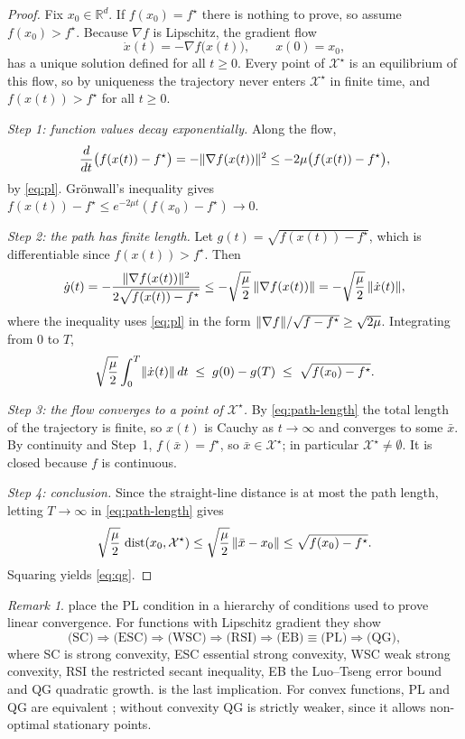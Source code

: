 \documentclass[11pt,a4paper,oneside]{report}
\theoremstyle{plain}
\theoremstyle{definition}
\theoremstyle{remark}
\newtheorem{remark}[theorem]{Remark}
\newcommand{\R}{\mathbb{R}}
\newcommand{\X}{\mathcal{X}^\star}
\DeclarePairedDelimiter{\norm}{\lVert}{\rVert}
\DeclareMathOperator{\dist}{dist}
\begin{document}
\begin{proof}
Fix $x_0\in\R^d$. If $f(x_0) = f^\star$ there is nothing to prove, so assume $f(x_0) > f^\star$. Because $\nabla f$ is Lipschitz, the gradient flow
\[
  \dot{x}(t) = -\nabla f\bigl(x(t)\bigr), \qquad x(0) = x_0,
\]
has a unique solution defined for all $t\ge 0$. Every point of $\X$ is an equilibrium of this flow, so by uniqueness the trajectory never enters $\X$ in finite time, and $f(x(t)) > f^\star$ for all $t\ge0$.

\emph{Step 1: function values decay exponentially.} Along the flow,
\[
  \frac{d}{dt}\bigl(f(x(t)) - f^\star\bigr) = -\norm{\nabla f(x(t))}^2 \le -2\mu\bigl(f(x(t)) - f^\star\bigr),
\]
by \eqref{eq:pl}. Grönwall's inequality gives $f(x(t)) - f^\star \le e^{-2\mu t}(f(x_0) - f^\star)\to 0$.

\emph{Step 2: the path has finite length.} Let $g(t) = \sqrt{f(x(t)) - f^\star}$, which is differentiable since $f(x(t)) > f^\star$. Then
\[
  \dot{g}(t) = -\frac{\norm{\nabla f(x(t))}^2}{2\sqrt{f(x(t)) - f^\star}}
  \le -\sqrt{\frac{\mu}{2}}\,\norm{\nabla f(x(t))} = -\sqrt{\frac{\mu}{2}}\,\norm{\dot{x}(t)},
\]
where the inequality uses \eqref{eq:pl} in the form $\norm{\nabla f}/\sqrt{f - f^\star}\ge\sqrt{2\mu}$. Integrating from $0$ to $T$,
\begin{equation}\label{eq:path-length}
  \sqrt{\frac{\mu}{2}}\int_0^T\norm{\dot{x}(t)}\,dt \;\le\; g(0) - g(T) \;\le\; \sqrt{f(x_0) - f^\star}.
\end{equation}

\emph{Step 3: the flow converges to a point of $\X$.} By \eqref{eq:path-length} the total length of the trajectory is finite, so $x(t)$ is Cauchy as $t\to\infty$ and converges to some $\bar{x}$. By continuity and Step~1, $f(\bar{x}) = f^\star$, so $\bar{x}\in\X$; in particular $\X\neq\emptyset$. It is closed because $f$ is continuous.

\emph{Step 4: conclusion.} Since the straight-line distance is at most the path length, letting $T\to\infty$ in \eqref{eq:path-length} gives
\[
  \sqrt{\frac{\mu}{2}}\,\dist(x_0, \X) \le \sqrt{\frac{\mu}{2}}\,\norm{\bar{x} - x_0} \le \sqrt{f(x_0) - f^\star}.
\]
Squaring yields \eqref{eq:qg}.
\end{proof}

\begin{remark}\label{rem:hierarchy}
\citet{karimi2016} place the PL condition in a hierarchy of conditions used to prove linear convergence. For functions with Lipschitz gradient they show
\[
  \text{(SC)} \Rightarrow \text{(ESC)} \Rightarrow \text{(WSC)} \Rightarrow \text{(RSI)} \Rightarrow \text{(EB)} \equiv \text{(PL)} \Rightarrow \text{(QG)},
\]
where SC is strong convexity, ESC essential strong convexity, WSC weak strong convexity, RSI the restricted secant inequality, EB the Luo--Tseng error bound \citep{luo1993} and QG quadratic growth.  is the last implication. For convex functions, PL and QG are equivalent \citep{karimi2016,necoara2019}; without convexity QG is strictly weaker, since it allows non-optimal stationary points.
\end{remark}
\end{document}
